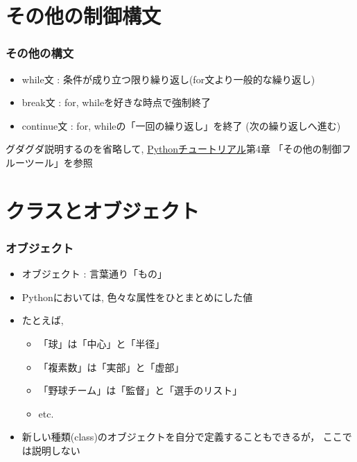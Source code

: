 \documentclass[10pt,dvipdfmx]{beamer}
\newcommand{\ao}[1]{{\color{blue}#1}}
\newcommand{\aka}[1]{{\color{red}#1}}
\begin{document}
\section{その他の制御構文}

\begin{frame}
\frametitle{その他の構文}

\begin{itemize}
\item \aka{while文} : 条件が成り立つ限り繰り返し(for文より一般的な繰り返し)
\item \aka{break文} : for, whileを好きな時点で強制終了
\item \aka{continue文} : for, whileの「一回の繰り返し」を終了
  (次の繰り返しへ進む)
\end{itemize}

グダグダ説明するのを省略して, 
\hyperlink{http://docs.python.jp/2/tutorial/index.html}
{Pythonチュートリアル}第4章 「その他の制御フルーツール」を参照

\end{frame}





\section{クラスとオブジェクト}
\begin{frame}
\frametitle{オブジェクト}
\begin{itemize}
\item オブジェクト : 言葉通り「もの」
\item Pythonにおいては, \ao{色々な属性をひとまとめにした値}
\item たとえば, 
  \begin{itemize}
  \item 「球」は「中心」と「半径」
  \item 「複素数」は「実部」と「虚部」
  \item 「野球チーム」は「監督」と「選手のリスト」
  \item etc.
  \end{itemize}
\item 新しい種類(class)のオブジェクトを自分で定義することもできるが，
ここでは説明しない
\end{itemize}
\end{frame}
\end{document}
